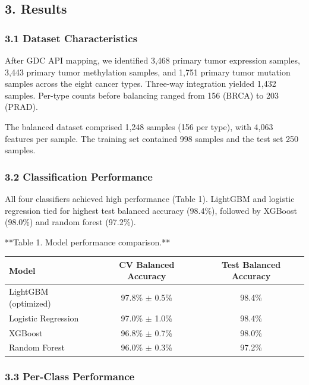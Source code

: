 \subsection{3. Results}\label{results}

\subsubsection{3.1 Dataset
Characteristics}\label{dataset-characteristics}

After GDC API mapping, we identified 3,468 primary tumor expression
samples, 3,443 primary tumor methylation samples, and 1,751 primary
tumor mutation samples across the eight cancer types. Three-way
integration yielded 1,432 samples. Per-type counts before balancing
ranged from 156 (BRCA) to 203 (PRAD).

The balanced dataset comprised 1,248 samples (156 per type), with 4,063
features per sample. The training set contained 998 samples and the test
set 250 samples.

\subsubsection{3.2 Classification
Performance}\label{classification-performance}

All four classifiers achieved high performance (Table 1). LightGBM and
logistic regression tied for highest test balanced accuracy (98.4\%),
followed by XGBoost (98.0\%) and random forest (97.2\%).

**Table 1. Model performance comparison.**
\begin{center}
\begin{tabular}{lcc}
\toprule
\textbf{Model} & \textbf{CV Balanced Accuracy} & \textbf{Test Balanced Accuracy} \\
\midrule
LightGBM (optimized) & 97.8\% $\pm$ 0.5\% & 98.4\% \\
Logistic Regression & 97.0\% $\pm$ 1.0\% & 98.4\% \\
XGBoost & 96.8\% $\pm$ 0.7\% & 98.0\% \\
Random Forest & 96.0\% $\pm$ 0.3\% & 97.2\% \\
\bottomrule
\end{tabular}
\end{center}

\subsubsection{3.3 Per-Class Performance}\label{per-class-performance}

